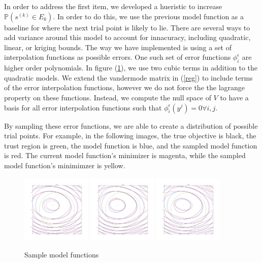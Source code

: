 \documentclass{article}
\theoremstyle{case}
\let\oldref\ref
\renewcommand{\ref}[1]{(\oldref{#1})}
\begin{document}

In order to address the first item, we developed a hueristic to increase $\mathbb P(s^{(k)} \in E_k)$.
In order to do this, we use the previous model function as a baseline for where the next trial point is likely to lie.
There are several ways to add variance around this model to account for innacuracy, including quadratic, linear, or kriging bounds.
The way we have implemented is using a set of interpolation functions as possible errors.
One such set of error functions $\phi^{\epsilon}_i$ are higher order polynomials.
In figure \ref{smf}, we use two cubic terms in addition to the quadratic models.
We extend the vandermode matrix in \ref{reg} to include terms of the error interpolation functions, however we do not force the the lagrange property on these functions.
Instead, we compute the null space of $V$ to have a basis for all error interpolation functions such that $\phi^{\epsilon}_i(y^j) = 0 \forall i,j$.

By sampling these error functions, we are able to create a distribution of possible trial points.
For example, in the following images, the true objective is black, the trust region is green, the model function is blue, and the sampled model function is red.
The current model function's minimizer is magenta, while the sampled model function's minimimzer is yellow.

\begin{figure}[h]
    \centering
    \includegraphics[width=125px]{images/other_polynomial_2.png}
    \includegraphics[width=125px]{images/other_polynomial_3.png}
    \includegraphics[width=125px]{images/other_polynomial_5.png}
    \caption{Sample model functions}
    \label{smf}
\end{figure}
\end{document}
